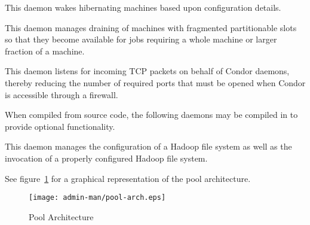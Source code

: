 \begin{description}
\item[\Condor{rooster}] This daemon wakes hibernating machines based
upon configuration details.

\item[\Condor{defrag}] This daemon manages draining of machines
with fragmented partitionable slots so that they become available
for jobs requiring a whole machine or larger fraction of a machine.

\item[\Condor{shared\_port}] This daemon listens for incoming TCP packets
on behalf of Condor daemons, thereby reducing the number of required
ports that must be opened when Condor is accessible through a firewall. 



\end{description} 

When compiled from source code,
the following daemons may be compiled in to provide optional functionality.
\begin{description} 

\item[\Condor{hdfs}] This daemon manages the configuration of a
Hadoop file system as well as the invocation of a properly configured
Hadoop file system.

\end{description} 


See figure~\ref{fig:pool-arch} for a graphical representation of the
pool architecture. 

\begin{figure}[hbt]
\centering
\texttt{[image: admin-man/pool-arch.eps]}
\caption{\label{fig:pool-arch}Pool Architecture}
\end{figure}
